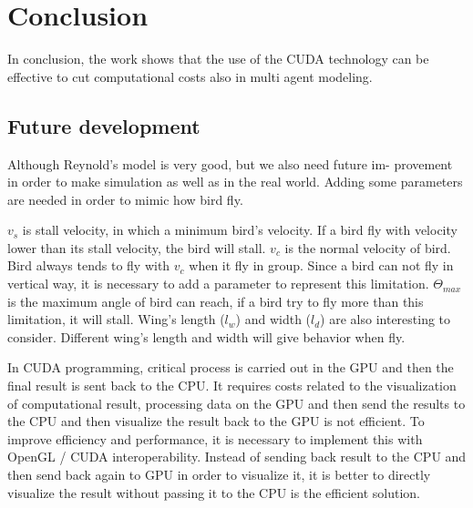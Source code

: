 \documentclass[journal,transmag]{IEEEtran}
\begin{document}
\section{Conclusion}
In conclusion, the work shows that the use of the CUDA technology can be effective to cut computational costs also in multi agent
modeling.

\subsection{Future development}
Although Reynold’s model is very good, but we also need future im-
provement in order to make simulation as well as in the real world.
Adding some parameters are needed in order to mimic how bird fly.

\(v_s\) is stall velocity, in which a minimum bird's velocity. If a bird fly with velocity lower than its stall velocity, the bird will stall. \(v_c\) is the normal velocity of bird. Bird always tends to fly with \(v_c\) when it fly in group. Since a bird can not fly in vertical way, it is necessary to add a parameter to represent this limitation. \(\Theta_{max}\) is the maximum angle of bird can reach, if a bird try to fly more than this limitation, it will stall. Wing's length (\(l_w\)) and width (\(l_d\)) are also interesting to consider. Different wing's length and width will give behavior when fly.

In CUDA programming, critical process is carried out in the GPU and
then the final result is sent back to the CPU. It requires costs related to
the visualization of computational result, processing data on the GPU
and then send the results to the CPU and then visualize the result back
to the GPU is not efficient. To improve efficiency and performance, it
is necessary to implement this with OpenGL / CUDA interoperability.
Instead of sending back result to the CPU and then send back again to
GPU in order to visualize it, it is better to directly visualize the result
without passing it to the CPU is the efficient solution.








\end{document}
